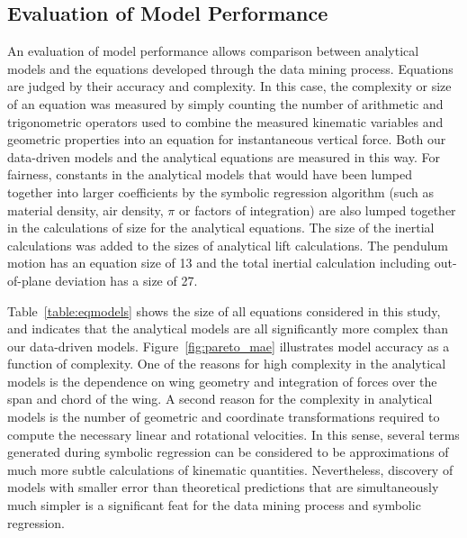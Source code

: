\documentclass{article}
\begin{document}
\subsection*{Evaluation of Model Performance}
An evaluation of model performance allows comparison between analytical models
and the equations developed through the data mining process.  Equations are
judged by their accuracy and complexity.  In this case, the complexity or size
of an equation was measured by simply counting the number of arithmetic and
trigonometric operators used to combine the measured kinematic variables and
geometric properties into an equation for instantaneous vertical force.  Both
our data-driven models and the analytical equations are measured in this way.
For fairness, constants in the analytical models that would have been lumped
together into larger coefficients by the symbolic regression algorithm (such as
material density, air density, \(\pi\) or factors of integration) are also
lumped together in the calculations of size for the analytical equations. The
size of the inertial calculations was added to the sizes of analytical lift
calculations.  The pendulum motion has an equation size of 13 and the total
inertial calculation including out-of-plane deviation has a size of 27.

Table~\ref{table:eqmodels} shows the size of all equations considered in this
study, and indicates that the analytical models are all significantly more
complex than our data-driven models.  Figure~\ref{fig:pareto_mae} illustrates
model accuracy as a function of complexity.  One of the reasons for high
complexity in the analytical models is the dependence on wing geometry and
integration of forces over the span and chord of the wing.  A second reason for
the complexity in analytical models is the number of geometric and coordinate
transformations required to compute the necessary linear and rotational
velocities.  In this sense, several terms generated during symbolic regression
can be considered to be approximations of much more subtle calculations of
kinematic quantities. Nevertheless, discovery of models with smaller error than
theoretical predictions that are simultaneously much simpler is a significant
feat for the data mining process and symbolic regression.
\end{document}
